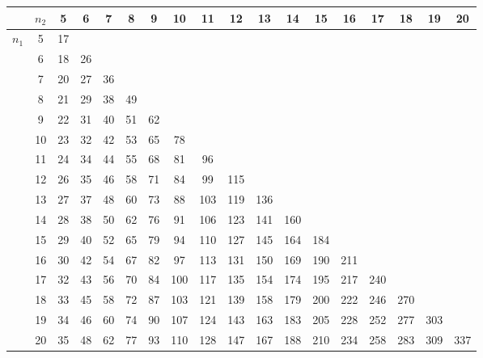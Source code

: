 \documentclass[a4paper,12pt]{article}
\begin{document}
\normalsize
\begin{tabular}{|cc||c|c|c|c|c|c|c|c|c|c|c|c|c|c|c|c|}
\hline
& $n_2$& 5 &  6 &  7&8& 9&10 &  11 &  12 &  13 &  14 &  15 &  16 &  17 &  18 &  19 &  20 \\ \hline \hline
$n_1$ & 5 &  17 &&&& &&&& &&&& &&& \\ \hline
& 6 &  18 &  26 &&&& &&&& &&&& && \\ \hline
& 7 &  20 &  27 &  36 &&&& &&&& &&&& & \\ \hline
& 8 &  21 &  29 &  38 &  49 &&&& &&&& &&&& \\ \hline
& 9 &  22 &  31 &  40 &  51 &  62 &&&& &&&& &&& \\ \hline
& 10 &  23 &  32 &  42 &  53 &  65 &  78 &&&& &&&& && \\ \hline
& 11 &  24 &  34 &  44 &  55 &  68 &  81 &  96 &&&& &&&& & \\ \hline
& 12 &  26 &  35 &  46 &  58 &  71 &  84 &  99 &  115 &&&& &&&& \\ \hline
& 13 &  27 &  37 &  48 &  60 &  73 &  88 &  103 &  119 &  136 &&&& &&& \\ \hline
& 14 &  28 &  38 &  50 &  62 &  76 &  91 &  106 &  123 &  141 &  160 &&&& && \\ \hline
& 15 &  29 &  40 &  52 &  65 &  79 &  94 &  110 &  127 &  145 &  164 &  184 &&&& & \\ \hline
& 16 &  30 &  42 &  54 &  67 &  82 &  97 &  113 &  131 &  150 &  169 &  190 &  211 &&&& \\ \hline
& 17 &  32 &  43 &  56 &  70 &  84 &  100 &  117 &  135 &  154 &  174 &  195 &  217 &  240 &&& \\ \hline
& 18 &  33 &  45 &  58 &  72 &  87 &  103 &  121 &  139 &  158 &  179 &  200 &  222 &  246 &  270 && \\ \hline
& 19 &  34 &  46 &  60 &  74 &  90 &  107 &  124 &  143 &  163 &  183 &  205 &  228 &  252 &  277 &  303 &\\ \hline
& 20 &  35 &  48 &  62 &  77 &  93 &  110 &  128 &  147 &  167 &  188 &  210 &  234 &  258 &  283 &  309 &  337
\\ \hline
\end{tabular}
 
\end{document}
